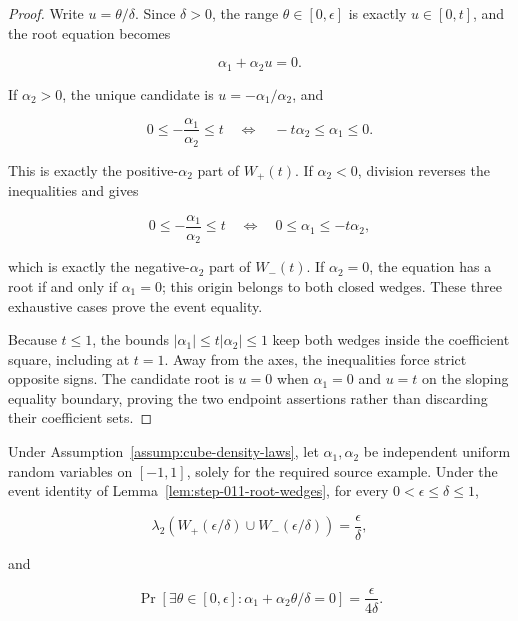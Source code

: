\begin{proof}
Write \(u=\theta/\delta\). Since \(\delta>0\), the range
\(\theta\in[0,\epsilon]\) is exactly \(u\in[0,t]\), and the root equation becomes

\begin{equation}
\label{eq:appendix-display-357}
\alpha_1+\alpha_2u=0.
\end{equation}

If \(\alpha_2>0\), the unique candidate is \(u=-\alpha_1/\alpha_2\), and

\begin{equation}
\label{eq:appendix-display-358}
0\leq-\frac{\alpha_1}{\alpha_2}\leq t
\quad\Longleftrightarrow\quad
-t\alpha_2\leq\alpha_1\leq0.
\end{equation}

This is exactly the positive-\(\alpha_2\) part of \(W_+(t)\). If \(\alpha_2<0\), division reverses the
inequalities and gives

\begin{equation}
\label{eq:appendix-display-359}
0\leq-\frac{\alpha_1}{\alpha_2}\leq t
\quad\Longleftrightarrow\quad
0\leq\alpha_1\leq-t\alpha_2,
\end{equation}

which is exactly the negative-\(\alpha_2\) part of \(W_-(t)\). If \(\alpha_2=0\), the equation has a root if
and only if \(\alpha_1=0\); this origin belongs to both closed wedges. These three exhaustive cases prove the
event equality.

Because \(t\leq1\), the bounds \(\lvert\alpha_1\rvert\leq t\lvert\alpha_2\rvert\leq1\) keep both wedges
inside the coefficient square, including at \(t=1\). Away from the axes, the inequalities force strict opposite
signs. The candidate root is \(u=0\) when \(\alpha_1=0\) and \(u=t\) on the sloping equality boundary, proving
the two endpoint assertions rather than discarding their coefficient sets. 
\end{proof}

\begin{proposition}
\label{prop:step-011-wedge-probability}

Under Assumption~\ref{assump:cube-density-laws}, let \(\alpha_1,\alpha_2\) be independent uniform random
variables on \([-1,1]\), solely for the required source example. Under the event identity of
Lemma~\ref{lem:step-011-root-wedges}, for every \(0<\epsilon\leq\delta\leq1\),

\begin{equation}
\label{eq:appendix-display-360}
\lambda_2(W_+(\epsilon/\delta)\cup W_-(\epsilon/\delta))
=\frac\epsilon\delta,
\end{equation}

and

\begin{equation}
\label{eq:appendix-display-361}
\Pr[\exists\theta\in[0,\epsilon]:
\alpha_1+\alpha_2\theta/\delta=0]
=\frac{\epsilon}{4\delta}.
\end{equation}


\end{proposition}

